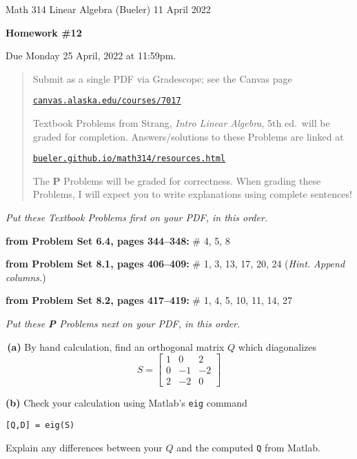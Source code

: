 \documentclass[12pt]{amsart}
\newcommand{\prob}[1]{\bigskip\noindent{\large \textbf{#1.}}\quad }
\newcommand{\probset}[2]{\bigskip\noindent\textbf{from Problem Set #1, pages #2:}\quad }
\newcommand{\epart}[1]{\medskip\noindent\textbf{(#1)}\quad }
\newcommand{\ppart}[1]{\,\textbf{(#1)}\quad }
\begin{document}
\scriptsize \noindent Math 314 Linear Algebra (Bueler) \hfill 11 April 2022
\normalsize\medskip

\Large
\centerline{\textbf{Homework \#12}}

\bigskip
\large
\centerline{Due Monday 25 April, 2022 at 11:59pm.}

\normalsize
\bigskip
\begin{quote}
\medskip
\noindent Submit as a single PDF via Gradescope; see the Canvas page

\href{https://canvas.alaska.edu/courses/7017}{\texttt{canvas.alaska.edu/courses/7017}}

\noindent Textbook Problems from Strang, \emph{Intro Linear Algebra}, 5th ed.~will be graded for completion.  Answers/solutions to these Problems are linked at

\href{https://bueler.github.io/math314/resources.html}{\texttt{bueler.github.io/math314/resources.html}}

\noindent The \textbf{P} Problems will be graded for correctness.  When grading these Problems, I will expect you to write explanations using complete sentences!
\end{quote}
\medskip

\thispagestyle{empty}

\noindent \hrulefill

\noindent \emph{Put these Textbook Problems first on your PDF, in this order.}

\probset{6.4}{344--348} \# 4, 5, 8

\probset{8.1}{406--409} \# 1, 3, 13, 17, 20, 24 (\emph{Hint. Append columns.})

\probset{8.2}{417--419} \# 1, 4, 5, 10, 11, 14, 27

\bigskip
\noindent \hrulefill

\noindent \emph{Put these \textbf{P} Problems next on your PDF, in this order.}

\prob{P57}  \ppart{a} By hand calculation, find an orthogonal matrix $Q$ which diagonalizes
    $$S = \begin{bmatrix} 1 & 0 & 2 \\ 0 & -1 & -2 \\ 2 & -2 & 0 \end{bmatrix}$$

\epart{b} Check your calculation using Matlab's \texttt{eig} command

\texttt{[Q,D] = eig(S)}

\noindent Explain any differences between your $Q$ and the computed \texttt{Q} from Matlab.
\end{document}
